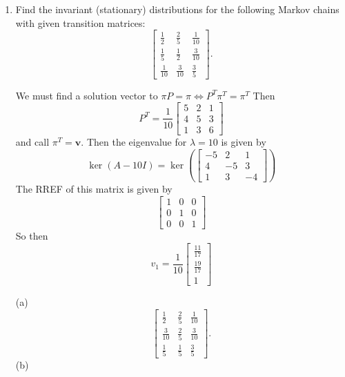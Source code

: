 \documentclass[10pt, oneside]{article}
\theoremstyle{definition}
\begin{document}
\begin{enumerate}
    \item Find the invariant (stationary) distributions for the following Markov chains with given transition matrices:
    \[
    \begin{bmatrix}
        \frac{1}{2} & \frac{2}{5} & \frac{1}{10} \\
        \frac{1}{5} & \frac{1}{2} & \frac{3}{10} \\
        \frac{1}{10} & \frac{3}{10} & \frac{3}{5}
    \end{bmatrix}.
    \]
    \begin{solution}
        We must find a solution vector to $\pi P = \pi \iff P^T \pi^T = \pi^T$ Then 
        \[P^T = 
        \frac{1}{10}\begin{bmatrix}
            5 & 2 & 1\\
            4 & 5 & 3\\
            1 & 3 & 6
        \end{bmatrix}\] and call $\pi^T = \textbf{v}.$ Then 
        the eigenvalue for $\lambda = 10$ is given by 
        \[\ker(A - 10I)  = \ker(\begin{bmatrix}
            -5 & 2 & 1\\
            4 & -5 & 3\\
            1 & 3 & -4
        \end{bmatrix})\] The RREF of this matrix is given by 
        \[
            \begin{bmatrix}
                1 &  0 & 0\\
                0 & 1 & 0\\
                0 & 0 & 1
            \end{bmatrix}\]
        So then 
        \[v_1 = 
        \frac{1}{10}\begin{bmatrix}
            \frac{11}{17}\\
            \frac{19}{17}\\
            1
        \end{bmatrix}\]
    \end{solution}
    (a)
    \[
    \begin{bmatrix}
        \frac{1}{2} & \frac{2}{5} & \frac{1}{10} \\
        \frac{3}{10} & \frac{2}{5} & \frac{3}{10} \\
        \frac{1}{5} & \frac{1}{5} & \frac{3}{5}
    \end{bmatrix}.
    \]
    (b)
\end{enumerate}
\end{document}
